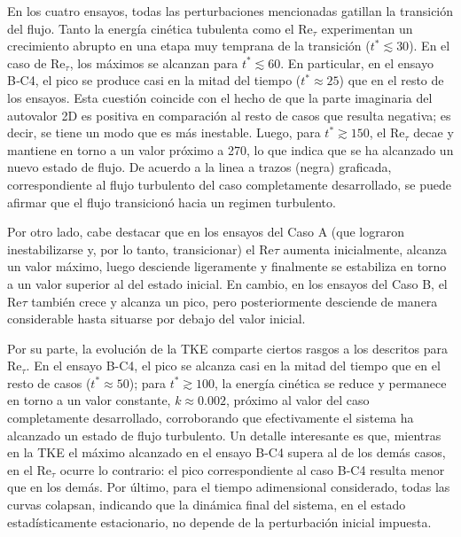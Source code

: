 En los cuatro ensayos, todas las perturbaciones mencionadas gatillan la transición del flujo. Tanto la energía cinética tubulenta como el Re$_{\tau}$ experimentan un crecimiento abrupto en una etapa muy temprana de la transición ($t^*\lesssim 30$). En el caso de Re$_{\tau}$, los máximos se alcanzan para $t^*\lesssim 60$. En particular, en el ensayo B‑C4, el pico se produce casi en la mitad del tiempo ($t^*\approx 25$) que en el resto de los ensayos. Esta cuestión coincide con el hecho de que la parte imaginaria del autovalor 2D es positiva en comparación al resto de casos que resulta negativa; es decir, se tiene un modo que es más inestable. Luego, para $t^* \gtrsim 150$, el Re$_{\tau}$ decae y mantiene en torno a un valor próximo a 270, lo que indica que se ha alcanzado un nuevo estado de flujo. De acuerdo a la linea a trazos (negra) graficada, correspondiente al flujo turbulento del caso completamente desarrollado, se puede afirmar que el flujo transicionó hacia un regimen turbulento.  


Por otro lado, cabe destacar que en los ensayos del Caso A (que lograron inestabilizarse y, por lo tanto, transicionar) el Re${\tau}$ aumenta inicialmente, alcanza un valor máximo, luego desciende ligeramente y finalmente se estabiliza en torno a un valor superior al del estado inicial. En cambio, en los ensayos del Caso B, el Re${\tau}$ también crece y alcanza un pico, pero posteriormente desciende de manera considerable hasta situarse por debajo del valor inicial.

Por su parte, la evolución de la TKE comparte ciertos rasgos a los descritos para Re$_{\tau}$. En el ensayo B-C4, el pico se alcanza casi en la mitad del tiempo que en el resto de casos ($t^*\approx 50$); para $t^* \gtrsim 100$, la energía cinética se reduce y permanece en torno a un valor constante, $k \approx 0\text{.}002$, próximo al valor del caso completamente desarrollado, corroborando que efectivamente el sistema ha alcanzado un estado de flujo turbulento. Un detalle interesante es que, mientras en la TKE el máximo alcanzado en el ensayo B-C4 supera al de los demás casos, en el Re$_{\tau}$ ocurre lo contrario: el pico correspondiente al caso B-C4 resulta menor que en los demás. Por último, para el tiempo adimensional considerado, todas las curvas colapsan, indicando que la dinámica final del sistema, en el estado estadísticamente estacionario, no depende de la perturbación inicial impuesta. 

